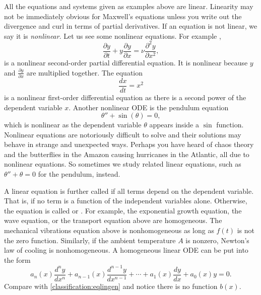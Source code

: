 All the equations and systems given as examples above are linear.  
Linearity may not be immediately obvious for Maxwell's equations unless you write out
the divergence and curl in terms of partial derivatives.
If an equation is not linear, we say it is
\emph{nonlinear}.
Let us see some
nonlinear equations.  For example ,
\begin{equation*}
\frac{\partial y}{\partial t} + 
y \frac{\partial y}{\partial x} =
\nu \frac{\partial^2 y}{\partial x^2} ,
\end{equation*}
is a nonlinear second-order partial differential equation.  It is nonlinear
because $y$ and $\frac{\partial y}{\partial x}$ are multiplied together.
The equation
\begin{equation} \label{classification:eqnonlinode}
\frac{dx}{dt} = x^2
\end{equation}
is a nonlinear first-order differential equation as there is a second power of
the dependent variable $x$.  Another nonlinear ODE is the pendulum equation
\begin{equation} \label{classification:pendulum}
\theta''+\sin(\theta)=0 ,
\end{equation}
which is nonlinear as the dependent
variable $\theta$ appears inside a $\sin$ function.
Nonlinear equations are notoriously difficult to solve and
their solutions may behave in strange and unexpected ways.
Perhaps you have heard of chaos theory and the butterflies 
in the Amazon causing hurricanes in the Atlantic, all due to nonlinear
equations.
So sometimes we
study related linear equations, such as $\theta''+\theta=0$ for the pendulum, instead.

\medskip

A linear equation is further called \emph{} if
all terms depend on the dependent variable.  That is, if no
term is a function of the independent variables alone.  Otherwise, the
equation is called \emph{} or
\emph{}.  For example,
the exponential growth equation, the wave equation, or the transport equation above
are homogeneous. The mechanical vibrations equation above is nonhomogeneous
as long as $f(t)$ is not the zero function.  Similarly, if the ambient temperature $A$ is nonzero,
Newton's law of cooling is nonhomogeneous.
A homogeneous linear ODE can be put into the form
\begin{equation*}
a_n(x) \frac{d^n y}{dx^n} + 
a_{n-1}(x) \frac{d^{n-1} y}{dx^{n-1}} + 
\cdots
+
a_{1}(x) \frac{dy}{dx}
+
a_{0}(x) y = 0 .
\end{equation*}
Compare with \eqref{classification:eqlingen} and notice there is no
function $b(x)$.

